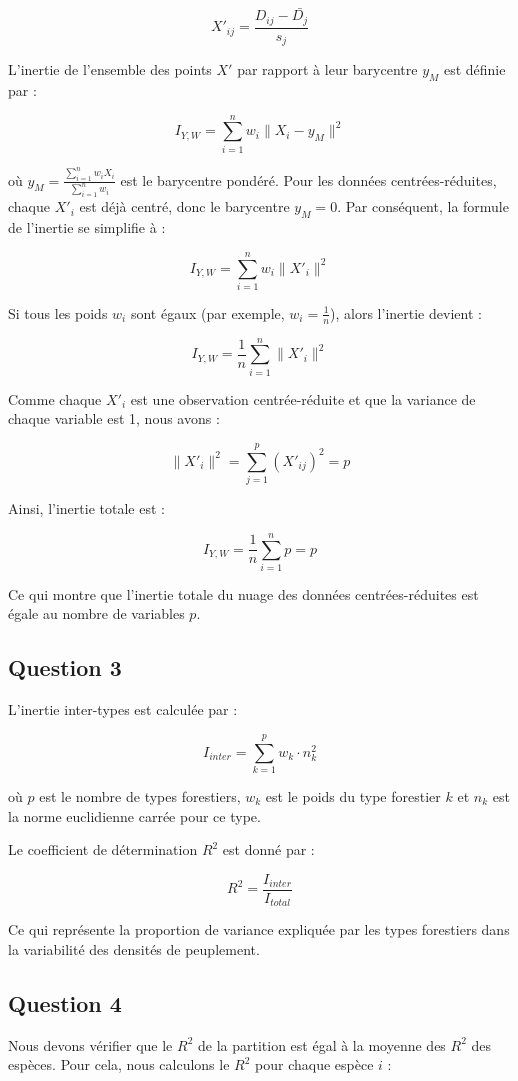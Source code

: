 \documentclass[a4paper,12pt]{article}
\begin{document}
\[
X'_{ij} = \frac{D_{ij} - \bar{D_{j}}}{s_{j}}
\]

L’inertie de l’ensemble des points \(X'\) par rapport à leur barycentre \(y_M\) est définie par :

\[
I_{Y,W} = \sum_{i=1}^{n} w_{i} \|X_{i} - y_M\|^{2}
\]

où \(y_M = \frac{\sum_{i=1}^{n} w_{i} X_{i}}{\sum_{i=1}^{n} w_{i}}\) est le barycentre pondéré. Pour les données centrées-réduites, chaque \(X'_{i}\) est déjà centré, donc le barycentre \(y_M = 0\). Par conséquent, la formule de l’inertie se simplifie à :

\[
I_{Y,W} = \sum_{i=1}^{n} w_{i} \|X'_{i}\|^{2}
\]

Si tous les poids \(w_{i}\) sont égaux (par exemple, \(w_{i} = \frac{1}{n}\)), alors l’inertie devient :

\[
I_{Y,W} = \frac{1}{n} \sum_{i=1}^{n} \|X'_{i}\|^{2}
\]

Comme chaque \(X'_{i}\) est une observation centrée-réduite et que la variance de chaque variable est 1, nous avons :

\[
\|X'_{i}\|^{2} = \sum_{j=1}^{p} (X'_{ij})^{2} = p
\]

Ainsi, l’inertie totale est :

\[
I_{Y,W} = \frac{1}{n} \sum_{i=1}^{n} p = p
\]

Ce qui montre que l’inertie totale du nuage des données centrées-réduites est égale au nombre de variables \(p\).

\subsection{Question 3}
L'inertie inter-types est calculée par :

\[
I_{inter} = \sum_{k=1}^{p} w_{k} \cdot n_{k}^{2}
\]

où \(p\) est le nombre de types forestiers, \(w_{k}\) est le poids du type forestier \(k\) et \(n_{k}\) est la norme euclidienne carrée pour ce type.

Le coefficient de détermination \( R^2 \) est donné par :

\[
R^2 = \frac{I_{inter}}{I_{total}}
\]

Ce qui représente la proportion de variance expliquée par les types forestiers dans la variabilité des densités de peuplement.

\subsection{Question 4}
Nous devons vérifier que le \( R^2 \) de la partition est égal à la moyenne des \( R^2 \) des espèces. Pour cela, nous calculons le \( R^2 \) pour chaque espèce \( i \) :
\end{document}
